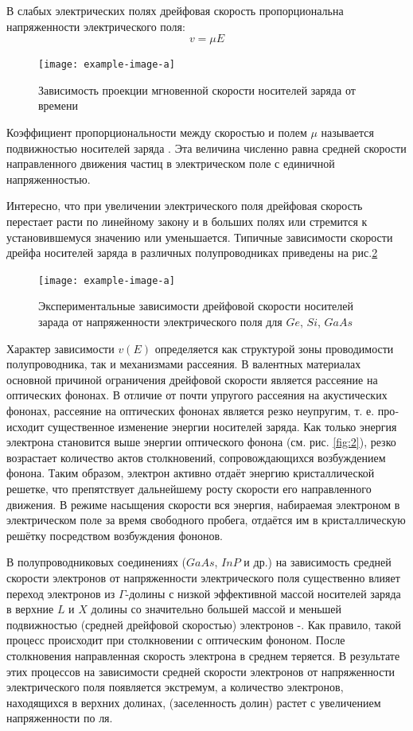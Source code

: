 В слабых электрических полях дрейфовая скорость пропорциональна напряженности электрического поля:
\begin{equation}
\label{eq:1.14}
	v=\mu E
\end{equation}

\begin{figure}[h!]
	\centering
	\texttt{[image: example-image-a]}
	\caption{Зависимость проекции мгновенной скорости носителей заряда от времени}
	\label{fig:3}
\end{figure}

Коэффициент пропорциональности между скоростью и полем $\mu$ называется подвижностью носителей заряда . Эта величина численно равна средней скорости
направленного движения частиц в электрическом поле с единичной напряженностью.

Интересно, что при увеличении электрического поля дрейфовая скорость
перестает расти по линейному закону и в больших полях или стремится к установившемуся значению или уменьшается. Типичные зависимости скорости
дрейфа носителей заряда в различных полупроводниках приведены на рис.\ref{fig:4}

\begin{figure}[h!]
	\centering
	\texttt{[image: example-image-a]}
	\caption{Экспериментальные зависимости дрейфовой скорости носителей зарада от напряженности электрического поля для $Ge$, $Si$, $GaAs$}
	\label{fig:4}
\end{figure}

Характер зависимости $v(E)$ определяется как структурой зоны проводимости полупроводника, так и механизмами рассеяния. В валентных материалах основной причиной ограничения дрейфовой скорости является рассеяние на оптических фононах. В отличие от почти упругого рассеяния на акустических фононах, рассеяние на оптических фононах является резко неупругим, т. е. про­
исходит существенное изменение энергии носителей заряда. Как только энергия
электрона становится выше энергии оптического фонона (см. рис. \ref{fig:2}), резко
возрастает количество актов столкновений, сопровождающихся возбуждением
фонона. Таким образом, электрон активно отдаёт энергию кристаллической
решетке, что препятствует дальнейшему росту скорости его направленного движения. В режиме насыщения скорости вся энергия, набираемая электроном в электрическом поле за время свободного пробега, отдаётся им в кристаллическую решётку посредством возбуждения фононов.

В полупроводниковых соединениях ($GaAs$, $InP$ и др.) на зависимость сред­ней скорости электронов от напряженности электрического поля существенно влияет переход электронов из $\Gamma$-долины с низкой эффективной массой носителей
заряда в верхние $L$ и $X$ долины со значительно большей массой и меньшей подвижностью (средней дрейфовой скоростью) электронов \cite{lit4}-\cite{lit5}. Как правило, такой
процесс происходит при столкновении с оптическим фононом. После столкновения направленная скорость электрона в среднем теряется. В результате этих
процессов на зависимости средней скорости электронов от напряженности электрического поля появляется экстремум, а количество электронов, находящихся в
верхних долинах, (заселенность долин) растет с увеличением напряженности по­
ля.

